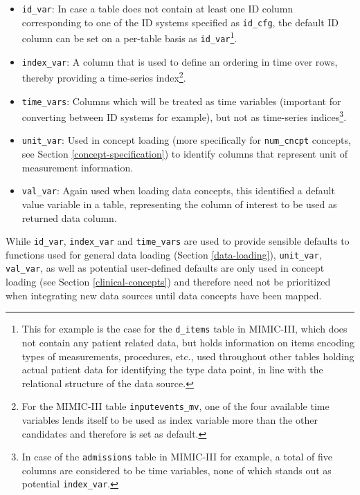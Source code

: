 \documentclass[
  notitle]{jss}
\providecommand{\tightlist}{%
  \setlength{\itemsep}{0pt}\setlength{\parskip}{0pt}}
\begin{document}
\begin{itemize}
\tightlist
\item
  \texttt{id\_var}: In case a table does not contain at least one ID
  column corresponding to one of the ID systems specified as
  \texttt{id\_cfg}, the default ID column can be set on a per-table
  basis as \texttt{id\_var}\footnote{This for example is the case for
    the \texttt{d\_items} table in MIMIC-III, which does not contain any
    patient related data, but holds information on items encoding types
    of measurements, procedures, etc., used throughout other tables
    holding actual patient data for identifying the type data point, in
    line with the relational structure of the data source.}.
\item
  \texttt{index\_var}: A column that is used to define an ordering in
  time over rows, thereby providing a time-series index\footnote{For the
    MIMIC-III table \texttt{inputevents\_mv}, one of the four available
    time variables lends itself to be used as index variable more than
    the other candidates and therefore is set as default.}.
\item
  \texttt{time\_vars}: Columns which will be treated as time variables
  (important for converting between ID systems for example), but not as
  time-series indices\footnote{In case of the \texttt{admissions} table
    in MIMIC-III for example, a total of five columns are considered to
    be time variables, none of which stands out as potential
    \texttt{index\_var}.}.
\item
  \texttt{unit\_var}: Used in concept loading (more specifically for
  \texttt{num\_cncpt} concepts, see Section \ref{concept-specification})
  to identify columns that represent unit of measurement information.
\item
  \texttt{val\_var}: Again used when loading data concepts, this
  identified a default value variable in a table, representing the
  column of interest to be used as returned data column.
\end{itemize}

While \texttt{id\_var}, \texttt{index\_var} and \texttt{time\_vars} are
used to provide sensible defaults to functions used for general data
loading (Section \ref{data-loading}), \texttt{unit\_var},
\texttt{val\_var}, as well as potential user-defined defaults are only
used in concept loading (see Section \ref{clinical-concepts}) and
therefore need not be prioritized when integrating new data sources
until data concepts have been mapped.
\end{document}
